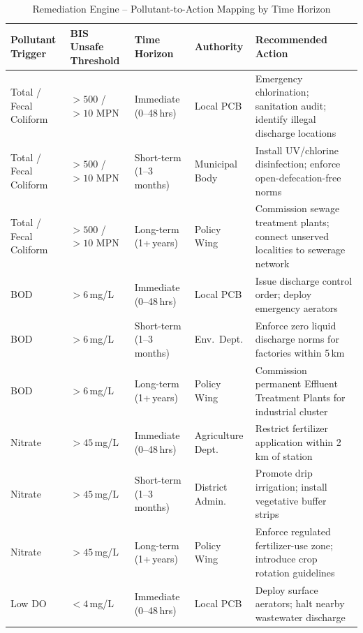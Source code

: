 \documentclass[12pt,a4paper]{report}
\numberwithin{table}{chapter}
\numberwithin{figure}{chapter}
\begin{document}
\vspace{0.3cm}
\begin{table}[ht]
\caption{Remediation Engine -- Pollutant-to-Action Mapping by Time Horizon}
\label{tab:remediation}
\centering
\footnotesize
\begin{tabular}{@{} L{2.0cm} L{1.8cm} L{1.8cm} L{2.2cm} L{5.2cm} @{}}
\toprule
\textbf{Pollutant Trigger} & \textbf{BIS Unsafe Threshold} & \textbf{Time Horizon} & \textbf{Authority} & \textbf{Recommended Action} \\
\midrule
Total / Fecal Coliform & $>500$ / $>10$ MPN & Immediate (0--48\,hrs) & Local PCB & Emergency chlorination; sanitation audit; identify illegal discharge locations \\
Total / Fecal Coliform & $>500$ / $>10$ MPN & Short-term (1--3\,months) & Municipal Body & Install UV/chlorine disinfection; enforce open-defecation-free norms \\
Total / Fecal Coliform & $>500$ / $>10$ MPN & Long-term (1+\,years) & Policy Wing & Commission sewage treatment plants; connect unserved localities to sewerage network \\
BOD                    & $> 6$\,mg/L         & Immediate (0--48\,hrs) & Local PCB & Issue discharge control order; deploy emergency aerators \\
BOD                    & $> 6$\,mg/L         & Short-term (1--3\,months) & Env.\ Dept. & Enforce zero liquid discharge norms for factories within 5\,km \\
BOD                    & $> 6$\,mg/L         & Long-term (1+\,years) & Policy Wing & Commission permanent Effluent Treatment Plants for industrial cluster \\
Nitrate                & $> 45$\,mg/L        & Immediate (0--48\,hrs) & Agriculture Dept. & Restrict fertilizer application within 2\,km of station \\
Nitrate                & $> 45$\,mg/L        & Short-term (1--3\,months) & District Admin. & Promote drip irrigation; install vegetative buffer strips \\
Nitrate                & $> 45$\,mg/L        & Long-term (1+\,years) & Policy Wing & Enforce regulated fertilizer-use zone; introduce crop rotation guidelines \\
Low DO                 & $< 4$\,mg/L         & Immediate (0--48\,hrs) & Local PCB & Deploy surface aerators; halt nearby wastewater discharge \\
\bottomrule
\end{tabular}
\end{table}
\end{document}
